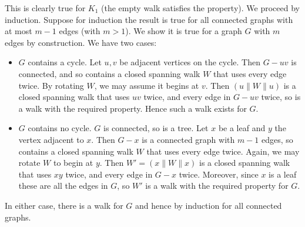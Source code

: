 This is clearly true for $K_1$ (the empty walk satisfies the property). We
proceed by induction. Suppose for induction the result is true for all
connected graphs with at most $m-1$ edges (with $m>1$). We show it is true
for a graph $G$ with $m$ edges by construction. We have two cases:
	\begin{itemize} 
	\item $G$ contains a cycle. Let $u,v$ be adjacent vertices on the
	 cycle. Then $G-uv$ is connected, and so contains a closed spanning walk
	 $W$ that uses every edge twice. By rotating $W$, we may assume it begins
	 at $v$. Then $(u \| W \| u)$ is a closed spanning walk that uses $uv$
	 twice, and every edge in $G-uv$ twice, so is a walk with the required
	 property. Hence such a walk exists for $G$.

	 \item $G$ contains no cycle. $G$ is connected, so is a tree. Let $x$
	 be a leaf and $y$ the vertex adjacent to $x$. Then $G-x$ is a connected 
	 graph
	 with $m-1$ edges, so contains a closed spanning walk $W$ that uses
	 every edge twice. Again, we may rotate $W$ to begin at $y$. Then
	 $W'=(x\| W \| x)$ is a closed spanning walk that uses $xy$ twice,
	 and every edge in $G-x$ twice. Moreover, since $x$ is a leaf these are
	 all the edges in $G$, so $W'$ is a walk with the required property
	 for $G$.

 \end{itemize}
In either case, there is a walk for $G$ and hence by induction for all
connected graphs.
